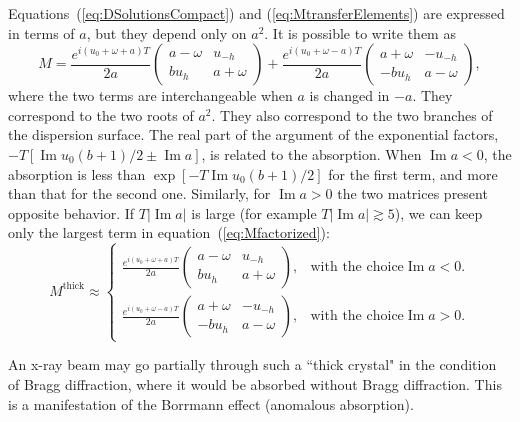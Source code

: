 \documentclass[preprint]{iucr}              %
\begin{document}
Equations~(\ref{eq:DSolutionsCompact}) and (\ref{eq:MtransferElements}) are expressed in terms of $a$, but they depend only on $a^2$.
It is possible to write them as 
\begin{equation}\label{eq:Mfactorized}
    M =
    \frac{e^{i(u_0+\omega+a)T}}{2a}
    \begin{pmatrix}
    a-\omega & u_{-h}\\
    b u_h & a + \omega
    \end{pmatrix}
    + 
    \frac{e^{i(u_0+\omega-a)T}}{2a}
    \begin{pmatrix}
    a+\omega & -u_{-h}\\
    -b u_h & a - \omega
    \end{pmatrix}, 
\end{equation}
where the two terms are interchangeable when $a$ is changed in $-a$. They correspond to the two roots of $a^2$.
They also correspond to the two branches of the dispersion surface. 
The real part of the argument of the exponential factors, $-T [\operatorname{Im} u_0 (b+1)/2  \pm \operatorname{Im} a]$, is related to the absorption.
When $\operatorname{Im}a<0$, the absorption is less than $\exp[-T \operatorname{Im} u_0 (b+1)/2 ]$ for the first term, and more than that for the second one.
Similarly, for  $\operatorname{Im}a > 0$ the two matrices present opposite behavior.  If $T |\operatorname{Im}a|$ is large (for example $T |\operatorname{Im}a|  \gtrsim 5$), we can keep only the largest term in equation~(\ref{eq:Mfactorized}):
\begin{equation}\label{eq:Mthickapprox}
    M^{\text{thick}} \approx \begin{cases} 
    \frac{e^{i(u_0+\omega+a)T}}{2a}
    \begin{pmatrix}
    a-\omega & u_{-h}\\
    b u_h & a + \omega
    \end{pmatrix}, & \text{with the choice} \operatorname{Im}a<0.\\
    
    \frac{e^{i(u_0+\omega-a)T}}{2a}
    \begin{pmatrix}
    a+\omega & -u_{-h}\\
    -b u_h & a - \omega
    \end{pmatrix}, & \text{with the choice} \operatorname{Im}a>0.
    \end{cases}
\end{equation} 

An x-ray beam may go partially through such a ``thick crystal" in the condition of Bragg diffraction, where it would be absorbed without Bragg diffraction. This is a manifestation of the Borrmann effect (anomalous absorption).
\end{document}
